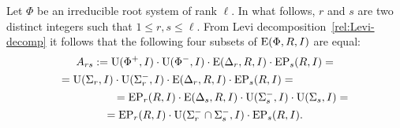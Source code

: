 Let $\Phi$ be an irreducible root system of rank $\ell$.
In what follows, $r$ and $s$ are two distinct integers such that $1 \leq r, s \leq \ell$.
From Levi decomposition~\eqref{rel:Levi-decomp} it follows that the following four subsets of $\operatorname{E}(\Phi, R, I)$ are equal:
\begin{multline*}
A_{rs} := \operatorname{U}(\Phi^+, I)\cdot \operatorname{U}(\Phi^-, I) \cdot \operatorname{E}(\Delta_r, R, I) \cdot \operatorname{EP}_s(R, I) = \\
= \operatorname{U}(\Sigma_r, I)\cdot \operatorname{U}(\Sigma^-_r, I) \cdot \operatorname{E}(\Delta_r, R, I) \cdot \operatorname{EP}_s(R, I) = \hspace{5em} \\
\hspace{5em} = \operatorname{EP}_r(R, I) \cdot \operatorname{E}(\Delta_s, R, I) \cdot \operatorname{U}(\Sigma_s^-, I)\cdot \operatorname{U}(\Sigma_s, I) = \\
= \operatorname{EP}_r(R, I) \cdot \operatorname{U}(\Sigma^-_r \cap \Sigma^-_s, I) \cdot \operatorname{EP}_s(R, I).
\end{multline*}

